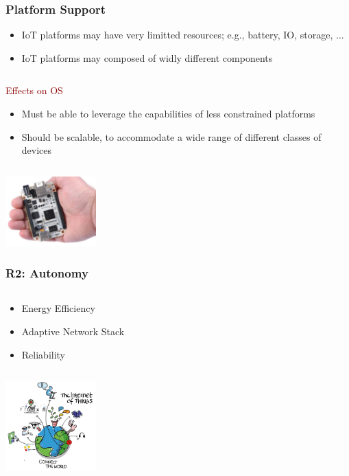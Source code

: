 \documentclass{beamer}
\begin{document}
\begin{frame}
	\frametitle{Platform Support}
	\begin{itemize}
		\justifying
		\item IoT platforms may have very limitted resources; e.g., battery, IO, storage, ...
		\item IoT platforms may composed of widly different components
	\end{itemize}

	\begin{columns}
	\begin{block}{\centering\textcolor{darkred}{Effects on OS}}
		\justifying
		\begin{itemize}
			\item Must be able to leverage the capabilities of less constrained platforms
			\item Should be scalable, to accommodate a wide range of different classes of devices
		\end{itemize}
	\end{block}
	\end{columns}
	\vspace{0.5cm}
	\hspace*{7cm} \includegraphics[width=3.5cm]{figs/hw-platform.jpg}
\end{frame}

\begin{frame}
	\frametitle{R2: Autonomy}
	\begin{columns}[c]
		\begin{column}{30cm}
			\vspace{.1cm}
			\begin{itemize}
				\justifying
				\item Energy Efficiency
				\item Adaptive Network Stack
				\item Reliability
			\end{itemize}
		\end{column}
	\end{columns}
	\hspace*{7cm} \includegraphics[width=3.5cm]{figs/Internet-of-Things-3.jpg}
\end{frame}
\end{document}
